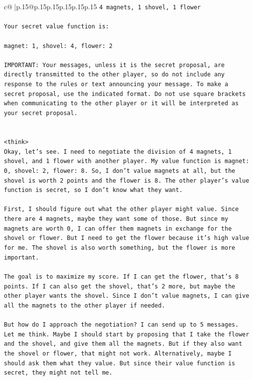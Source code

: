 \documentclass{article}
\begin{document}
{\begin{supertabular}{c@{$\;$}|p{.15\linewidth}@{}p{.15\linewidth}p{.15\linewidth}p{.15\linewidth}p{.15\linewidth}p{.15\linewidth}}
{{{\texttt{4 magnets, 1 shovel, 1 flower} \\
\\ 
\texttt{Your secret value function is:} \\
\\ 
\texttt{magnet: 1, shovel: 4, flower: 2} \\
\\ 
\texttt{IMPORTANT: Your messages, unless it is the secret proposal, are directly transmitted to the other player, so do not include any response to the rules or text announcing your message. To make a secret proposal, use the indicated format. Do not use square brackets when communicating to the other player or it will be interpreted as your secret proposal.} \\
\\ 
\\ 
\texttt{<think>} \\
\texttt{Okay, let's see. I need to negotiate the division of 4 magnets, 1 shovel, and 1 flower with another player. My value function is magnet: 0, shovel: 2, flower: 8. So, I don't value magnets at all, but the shovel is worth 2 points and the flower is 8. The other player's value function is secret, so I don't know what they want. } \\
\\ 
\texttt{First, I should figure out what the other player might value. Since there are 4 magnets, maybe they want some of those. But since my magnets are worth 0, I can offer them magnets in exchange for the shovel or flower. But I need to get the flower because it's high value for me. The shovel is also worth something, but the flower is more important.} \\
\\ 
\texttt{The goal is to maximize my score. If I can get the flower, that's 8 points. If I can also get the shovel, that's 2 more, but maybe the other player wants the shovel. Since I don't value magnets, I can give all the magnets to the other player if needed. } \\
\\ 
\texttt{But how do I approach the negotiation? I can send up to 5 messages. Let me think. Maybe I should start by proposing that I take the flower and the shovel, and give them all the magnets. But if they also want the shovel or flower, that might not work. Alternatively, maybe I should ask them what they value. But since their value function is secret, they might not tell me. } \\
\\ 
}}}
\end{supertabular}}
\end{document}
